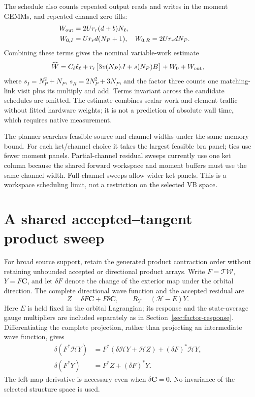 \documentclass[11pt,a4paper]{article}
\newcommand{\Wa}{\mathcal W}
\newcommand{\Ta}{\mathcal T}
\newcommand{\Ha}{\mathcal H}
\renewcommand{\vv}[1]{\mathbf{#1}}
\begin{document}
The schedule also counts repeated output reads and writes in the moment
GEMMs, and repeated channel zero fills:
\begin{align}
 W_{\rm out}&=2U r_r(d+b)N_\ell,\\
 W_{0,I}&=U r_r d(N_P+1),&
 W_{0,R}&=2U r_r dN_P.
\end{align}
Combining these terms gives the nominal variable-work estimate
\begin{equation}
 \widehat W=C_\ell\ell_\ell+
   r_r\bigl[3v(N_P)J+s(N_P)B\bigr]+W_0+W_{\rm out},
\end{equation}
where $s_I=N_P^2+N_P$, $s_R=2N_P^2+3N_P$, and the factor three counts
one matching-link visit plus its multiply and add. Terms invariant across
the candidate schedules are omitted. The estimate combines scalar work and
element traffic without fitted hardware weights; it is not a prediction of
absolute wall time, which requires native measurement.

The planner searches feasible source and channel widths under the same memory
bound. For each ket/channel choice it takes the largest feasible bra panel;
ties use fewer moment panels. Partial-channel residual sweeps currently use
one ket column because the shared forward workspace and moment buffers must
use the same channel width. Full-channel sweeps allow wider ket panels.
This is a workspace scheduling limit, not a restriction on the selected VB space.

\section{A shared accepted--tangent product sweep}\label{sec:product-jet}

For broad source support, retain the generated product contraction order
without retaining unbounded accepted or directional product arrays.
Write $F=\Ta\Wa$, $Y=F\vv C$, and let $\delta F$ denote the change of
the exterior map under the orbital direction. The complete directional
wave function and the accepted residual are
\begin{equation}
 Z=\delta F\vv C+F\delta\vv C,
 \qquad R_Y=(\Ha-E)Y.
\end{equation}
Here $E$ is held fixed in the orbital Lagrangian; its response and the
state-average gauge multipliers are included separately as in
Section~\ref{sec:factor-response}. Differentiating the complete projection,
rather than projecting an intermediate wave function, gives
\begin{align}
 \delta(F^*\Ha Y)&=F^*(\delta\Ha Y+\Ha Z)+(\delta F)^*\Ha Y,\label{eq:product-jet-H}\\
 \delta(F^*Y)&=F^*Z+(\delta F)^*Y.
 \label{eq:product-jet-images}
\end{align}
The left-map derivative is necessary even when $\delta\vv C=0$.
No invariance of the selected structure space is used.
\end{document}
